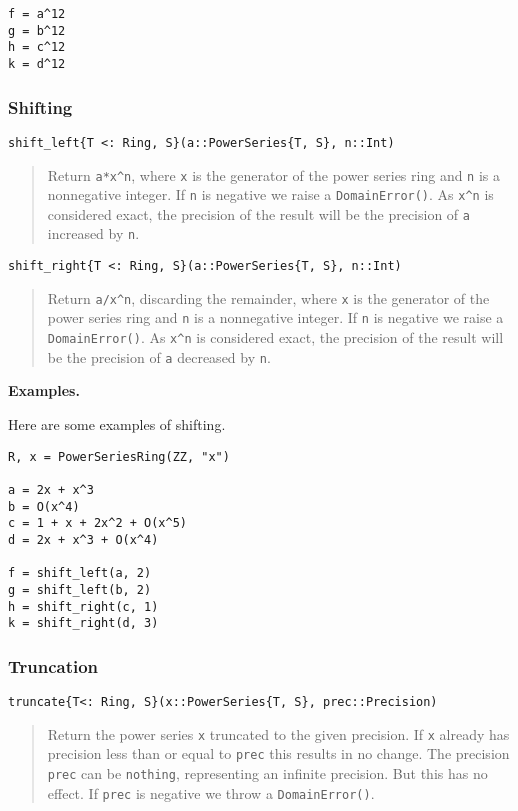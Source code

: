 \documentclass[a4paper,10pt]{article}
\newcommand{\code}{\lstinline}
\newcommand{\desc}[1]{\vspace{-3mm}\begin{quote}#1\end{quote}}
\begin{document}
{{{\begin{lstlisting}
f = a^12
g = b^12
h = c^12
k = d^12
\end{lstlisting}

\subsubsection{Shifting}

\begin{lstlisting}
shift_left{T <: Ring, S}(a::PowerSeries{T, S}, n::Int)
\end{lstlisting}

\desc{Return \code{a*x^n}, where \code{x} is the generator of the power series
ring and \code{n} is a nonnegative integer. If \code{n} is negative we raise
a \code{DomainError()}. As \code{x^n} is considered exact, the precision of
the result will be the precision of \code{a} increased by \code{n}.}

\begin{lstlisting}
shift_right{T <: Ring, S}(a::PowerSeries{T, S}, n::Int)
\end{lstlisting}

\desc{Return \code{a/x^n}, discarding the remainder, where \code{x} is the
generator of the power series ring and \code{n} is a nonnegative integer. If 
\code{n} is negative we raise a \code{DomainError()}. As \code{x^n} is
considered exact, the precision of the result will be the precision of \code{a}
decreased by \code{n}.}

\textbf{Examples.}

Here are some examples of shifting.

\begin{lstlisting}
R, x = PowerSeriesRing(ZZ, "x")

a = 2x + x^3
b = O(x^4)
c = 1 + x + 2x^2 + O(x^5)
d = 2x + x^3 + O(x^4)

f = shift_left(a, 2)
g = shift_left(b, 2)
h = shift_right(c, 1)
k = shift_right(d, 3)
\end{lstlisting}

\subsubsection{Truncation}

\begin{lstlisting}
truncate{T<: Ring, S}(x::PowerSeries{T, S}, prec::Precision)
\end{lstlisting}

\desc{Return the power series \code{x} truncated to the given precision. If
\code{x} already has precision less than or equal to \code{prec} this results
in no change. The precision \code{prec} can be \code{nothing}, representing
an infinite precision. But this has no effect. If \code{prec} is negative we
throw a \code{DomainError()}.}

}}}
\end{document}
